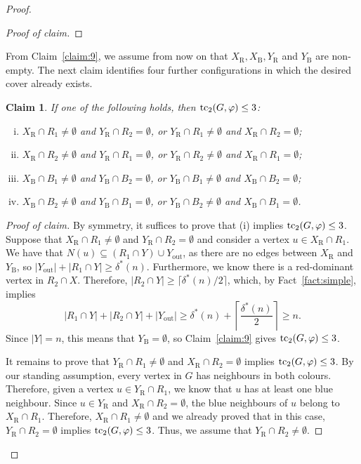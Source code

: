 \documentclass[12pt,reqno,a4paper]{amsart}
\newtheorem{claim}[theorem] {Claim}
\newenvironment{claimproof}[1][Proof of claim]{\begin{proof}[#1]\renewcommand{\qedsymbol}{$\scriptstyle\square$}}{\end{proof}}
\def\tc{\mathop{\text{\rm tc}}\nolimits}
\newcommand{\out}{\mathrm{out}}
\newcommand{\R}{\mathrm{R}}
\newcommand{\B}{\mathrm{B}}
\begin{document}
\begin{proof}
\begin{claimproof}
\end{claimproof}

From Claim~\ref{claim:9}, we assume from now on that $X_{\R}, X_{\B}, Y_{\R}$
and $Y_{\B}$ are non-empty. The next claim identifies four further
configurations in which the desired cover already exists.

\begin{claim}\label{claim:10}
If one of the following holds, then $\tc_2(G,\varphi) \le 3$:
\begin{enumerate}[(i)]
\item $X_{\R}\cap R_1\neq\emptyset$ and $Y_{\R}\cap R_2=\emptyset$, or
      $Y_{\R}\cap R_1\neq\emptyset$ and $X_{\R}\cap R_2=\emptyset$;
\item $X_{\R}\cap R_2\neq\emptyset$ and $Y_{\R}\cap R_1=\emptyset$, or
      $Y_{\R}\cap R_2\neq\emptyset$ and $X_{\R}\cap R_1=\emptyset$;
\item $X_{\B}\cap B_1\neq\emptyset$ and $Y_{\B}\cap B_2=\emptyset$, or
      $Y_{\B}\cap B_1\neq\emptyset$ and $X_{\B}\cap B_2=\emptyset$;
\item $X_{\B}\cap B_2\neq\emptyset$ and $Y_{\B}\cap B_1=\emptyset$, or
      $Y_{\B}\cap B_2\neq\emptyset$ and $X_{\B}\cap B_1=\emptyset$.
\end{enumerate}
\end{claim}
\begin{claimproof}
By symmetry, it suffices to prove that (i) implies $\tc_2(G,\varphi) \le 3$. Suppose
that $X_{\R} \cap R_1 \neq \emptyset$ and $Y_{\R} \cap R_2 = \emptyset$ and
consider a vertex $u \in X_{\R} \cap R_1$. We have that $N(u) \subseteq (R_1 \cap Y) \cup Y_{\out}$, as there are no edges between $X_{\R}$ and $Y_{\B}$, so $|Y_{\out}| + |R_1
\cap Y| \ge \delta^*(n)$. Furthermore, we know there is a red-dominant vertex in
$R_2 \cap X$. Therefore, $|R_2 \cap Y| \ge \lceil \delta^*(n)/2 \rceil$, which,
by Fact~\ref{fact:simple}, implies
\begin{equation*}
|R_1 \cap Y|+|R_2 \cap Y|+|Y_{\out}|
\ge \delta^*(n)+\left\lceil\frac{\delta^*(n)}{2}\right\rceil\ge n.
\end{equation*}
Since $|Y|=n$, this means that $Y_{\B}=\emptyset$, so Claim~\ref{claim:9}
gives $\tc_2(G,\varphi)\le3$.

It remains to prove that $Y_{\R} \cap R_1 \neq \emptyset$ and $X_{\R} \cap R_2 =
\emptyset$ implies $\tc_2(G,\varphi) \le 3$. By our standing assumption, every vertex in
$G$ has neighbours in both colours. Therefore, given a vertex $u \in Y_{\R} \cap
R_1$, we know that $u$ has at least one blue neighbour. Since $u \in Y_{\R}$ and
$X_{\R}\cap R_2 = \emptyset$, the blue neighbours of $u$ belong to $X_{\R} \cap
R_1$. Therefore, $X_{\R} \cap R_1 \neq \emptyset$ and we already proved that in
this case, $Y_{\R} \cap R_2 = \emptyset$ implies $\tc_2(G,\varphi) \le 3$. Thus, we
assume that $Y_{\R} \cap R_2 \neq \emptyset$. 



\end{claimproof}
\end{proof}
\end{document}
